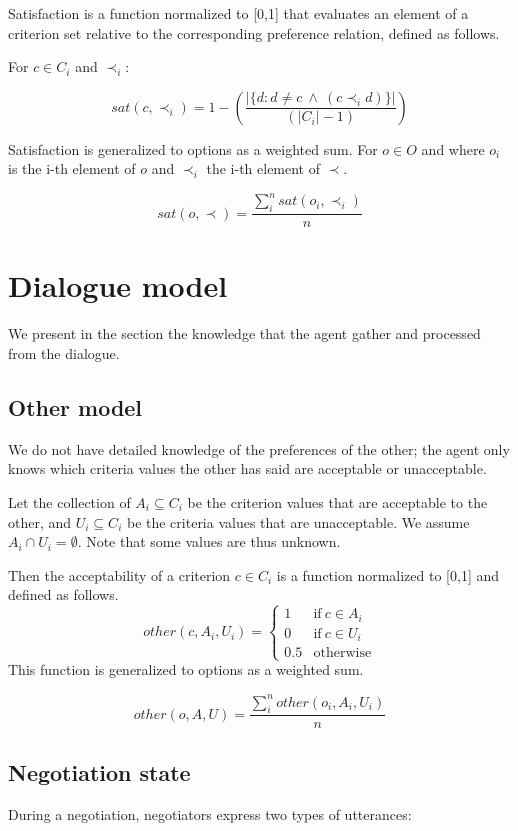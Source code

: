 \documentclass{article}
\begin{document}
	Satisfaction is a function normalized to [0,1] that evaluates an element of a criterion set relative to the corresponding preference relation, defined as follows.
	
	For $c \in C_i$ and $\prec_i$:
	
	$$sat(c, \prec_i) =	1 - \left( \frac{|\{d : d \neq c \  \wedge \ (c \prec_i d)\}| }{( |C_i| - 1 )}\right)  $$
	
	Satisfaction is generalized to options as a weighted sum.
	For $o \in O$ and where $o_i$ is the i-th element of $o$ and $\prec_i$ the i-th element of $\prec$.
	
	$$sat(o, \prec) = \frac{\sum_{i}^{n} sat(o_i, \prec_i) }{n} $$
	
	
	\section{Dialogue model}
	 We present in the section the knowledge that the agent gather and processed from the dialogue.

	\subsection{Other model}
		We do not have detailed knowledge of the preferences of the other; the agent only knows which criteria values the other has said are acceptable or unacceptable.

		Let the collection of $A_i \subseteq C_i$ be the criterion values that are acceptable to the other, and $U_i \subseteq C_i$ be the criteria values that are unacceptable.  We assume $A_i \cap U_i = \emptyset$.  Note	that some values are thus unknown.

		Then the acceptability of a criterion $c \in C_i$ is a function normalized to [0,1] and defined as follows.
		$$ other(c, A_i, U_i)= \left\{\begin{array}{ll}
			1	 & \mathrm{if\ }  c \in A_i\\
			0    & \mathrm{if\ }c \in U_i\\
			0.5	 & \mathrm{otherwise}
			\end{array}\right.$$
		This function is generalized to options as a weighted sum.
	
		$$other(o, A, U) = \frac{ \sum_{i}^{n} other(o_i, A_i, U_i) } {n}$$ 
	
	\subsection{Negotiation state}
		During a negotiation, negotiators express two types of utterances: %
		
\end{document}
